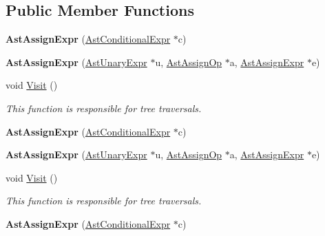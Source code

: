 \subsection*{Public Member Functions}
\begin{DoxyCompactItemize}
\item 
\hypertarget{classAstAssignExpr_adcf8fd9d2e80a579e8fad5ae28c79211}{{\bfseries Ast\-Assign\-Expr} (\hyperlink{classAstConditionalExpr}{Ast\-Conditional\-Expr} $\ast$c)}\label{classAstAssignExpr_adcf8fd9d2e80a579e8fad5ae28c79211}

\item 
\hypertarget{classAstAssignExpr_abbbd7c531a5c6fdecde141f46699f375}{{\bfseries Ast\-Assign\-Expr} (\hyperlink{classAstUnaryExpr}{Ast\-Unary\-Expr} $\ast$u, \hyperlink{classAstAssignOp}{Ast\-Assign\-Op} $\ast$a, \hyperlink{classAstAssignExpr}{Ast\-Assign\-Expr} $\ast$e)}\label{classAstAssignExpr_abbbd7c531a5c6fdecde141f46699f375}

\item 
void \hyperlink{classAstAssignExpr_a7e86da39b9d65e34a16314c0927b78d9}{Visit} ()
\begin{DoxyCompactList}\small\item\em This function is responsible for tree traversals. \end{DoxyCompactList}\item 
\hypertarget{classAstAssignExpr_adcf8fd9d2e80a579e8fad5ae28c79211}{{\bfseries Ast\-Assign\-Expr} (\hyperlink{classAstConditionalExpr}{Ast\-Conditional\-Expr} $\ast$c)}\label{classAstAssignExpr_adcf8fd9d2e80a579e8fad5ae28c79211}

\item 
\hypertarget{classAstAssignExpr_abbbd7c531a5c6fdecde141f46699f375}{{\bfseries Ast\-Assign\-Expr} (\hyperlink{classAstUnaryExpr}{Ast\-Unary\-Expr} $\ast$u, \hyperlink{classAstAssignOp}{Ast\-Assign\-Op} $\ast$a, \hyperlink{classAstAssignExpr}{Ast\-Assign\-Expr} $\ast$e)}\label{classAstAssignExpr_abbbd7c531a5c6fdecde141f46699f375}

\item 
void \hyperlink{classAstAssignExpr_a7e86da39b9d65e34a16314c0927b78d9}{Visit} ()
\begin{DoxyCompactList}\small\item\em This function is responsible for tree traversals. \end{DoxyCompactList}\item 
\hypertarget{classAstAssignExpr_adcf8fd9d2e80a579e8fad5ae28c79211}{{\bfseries Ast\-Assign\-Expr} (\hyperlink{classAstConditionalExpr}{Ast\-Conditional\-Expr} $\ast$c)}\label{classAstAssignExpr_adcf8fd9d2e80a579e8fad5ae28c79211}


\end{DoxyCompactItemize}

